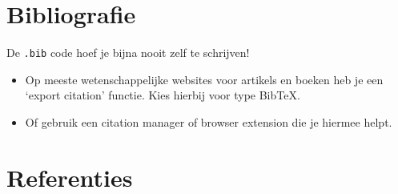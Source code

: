 \documentclass[
    dutch,
    everyoneauthor=true,
    defaultSlideCollection=vincent,
]{../../cursuspresentatie}
\begin{document}



\section{Bibliografie}
\def\placetarget{\hypertarget{bibliografie}{}}


\begin{frame}
    \centering
    De \texttt{.bib} code hoef je bijna nooit zelf te schrijven!

    \bigskip
    \raggedright
    \begin{itemize}[label=\textbullet]
        \item Op meeste wetenschappelijke websites voor artikels en boeken heb je
    een `export citation' functie. Kies hierbij voor type BibTeX.

        \item Of gebruik een citation manager of browser extension die je hiermee
    helpt.
    \end{itemize}
    
\end{frame}





\section{Referenties}\label{sec:textdocument}
\def\placetarget{\hypertarget{referenties}{}}
\end{document}
